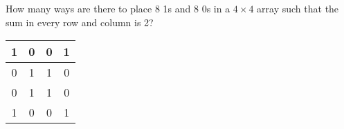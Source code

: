 How many ways are there to place 8 1s and 8 0s in a $4\times 4$ array such that the sum in every row and column is 2? 
\begin{center}
    \begin{tabular}{|c|c|c|c|}
    \hline
        1 & 0 & 0 & 1 \\ \hline
        0 & 1 & 1 & 0 \\ \hline
        0 & 1 & 1 & 0 \\  \hline
        1 & 0 & 0 & 1 \\ \hline
    \end{tabular}
\end{center}